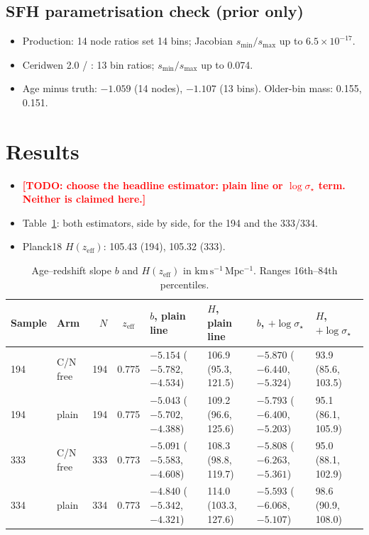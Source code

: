 \documentclass[fleqn,usenatbib]{mnras}
\newcommand{\todo}[1]{\textcolor{red}{\textbf{[TODO: #1]}}}
\newcommand{\Hu}{\ensuremath{\mathrm{km\,s^{-1}\,Mpc^{-1}}}}
\newcommand{\sig}{\ensuremath{\sigma_\star}}
\newcommand{\zeff}{\ensuremath{z_\mathrm{eff}}}
\begin{document}
\subsection{SFH parametrisation check (prior only)}
\begin{itemize}
\item Production: 14 node ratios set 14 bins; Jacobian $s_\mathrm{min}/s_\mathrm{max}$ up to $6.5\times10^{-17}$.
\item Ceridwen 2.0 / \citet[eq.~4]{Leja2019}: 13 bin ratios; $s_\mathrm{min}/s_\mathrm{max}$ up to 0.074.
\item Age minus truth: $-1.059$ (14 nodes), $-1.107$ (13 bins). Older-bin mass: 0.155, 0.151.
\end{itemize}

\section{Results}
\label{sec:results}
\begin{itemize}
\item \todo{choose the headline estimator: plain line or $\log\sig$ term. Neither is claimed here.}
\item Table~\ref{tab:h}: both estimators, side by side, for the 194 and the 333/334.
\item Planck18 $H(\zeff)$: 105.43 (194), 105.32 (333).
\end{itemize}

\begin{table}
\caption{Age--redshift slope $b$ and $H(\zeff)$ in \Hu. Ranges 16th--84th percentiles.}
\label{tab:h}
\begin{tabular}{llrcllll}
\hline
Sample & Arm & $N$ & $\zeff$ & $b$, plain line & $H$, plain line & $b$, $+\log\sig$ & $H$, $+\log\sig$ \\
\hline
194 & C/N free & 194 & 0.775 & $-5.154$ ($-5.782$, $-4.534$) & 106.9 (95.3, 121.5) & $-5.870$ ($-6.440$, $-5.324$) & 93.9 (85.6, 103.5) \\
194 & plain    & 194 & 0.775 & $-5.043$ ($-5.702$, $-4.388$) & 109.2 (96.6, 125.6) & $-5.793$ ($-6.400$, $-5.203$) & 95.1 (86.1, 105.9) \\
333 & C/N free & 333 & 0.773 & $-5.091$ ($-5.583$, $-4.608$) & 108.3 (98.8, 119.7) & $-5.808$ ($-6.263$, $-5.361$) & 95.0 (88.1, 102.9) \\
334 & plain    & 334 & 0.773 & $-4.840$ ($-5.342$, $-4.321$) & 114.0 (103.3, 127.6) & $-5.593$ ($-6.068$, $-5.107$) & 98.6 (90.9, 108.0) \\
\hline
\end{tabular}
\end{table}
\end{document}
